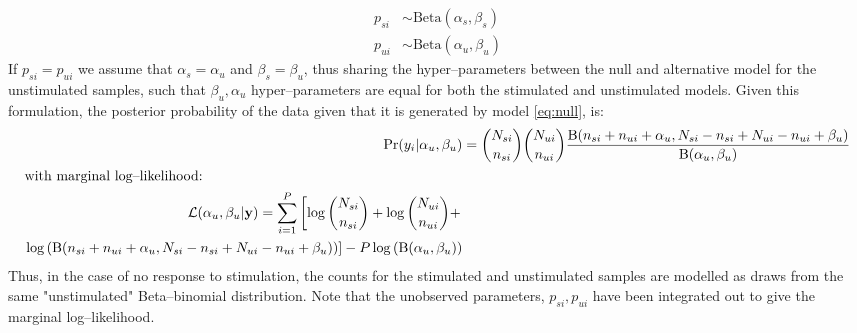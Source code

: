 \documentclass[11pt]{article}
\begin{document}
 \begin{align}
 p_{si} &\sim \mathrm{Beta}(\alpha_s,\beta_s)\label{eq:stimprior}\\
 p_{ui} &\sim \mathrm{Beta}(\alpha_u, \beta_u)\label{eq:nullprior}
 \end{align}
If $p_{si}=p_{ui}$ we assume that $\alpha_s=\alpha_u$ and $\beta_s=\beta_u$, thus sharing the hyper--parameters between the null and alternative model for the unstimulated samples, such that $\beta_u,\alpha_u$ hyper--parameters are equal for both the stimulated and unstimulated models. Given this formulation, the posterior probability of the data given that it is generated by model \eqref{eq:null}, is:
 \begin{align}
  	\mathrm{Pr}(y_i|\alpha_u,\beta_u)
	&=\binom{N_{si}}{n_{si}}\binom{N_{ui}}{n_{ui}}\frac{\mathrm{B}(n_{si}+n_{ui}+\alpha_u,N_{si}-n_{si}+N_{ui}-n_{ui}+\beta_u)}{\mathrm{B}(\alpha_u,\beta_u)}\label{eq:model1post}\\
	\intertext{with marginal log--likelihood:}
	\begin{split}
	\mathcal{L}(\alpha_u,\beta_u|\mathbf{y})=\sum_{i=1}^P\left[\log{\binom{N_{si}}{n_{si}}}+\log{\binom{N_{ui}}{n_{ui}}}+\right.\\
	\left.\log{\left(\mathrm{B}(n_{si}+n_{ui}+\alpha_u,N_{si}-n_{si}+N_{ui}-n_{ui}+\beta_u)\right)}\right]-P\log\left(\mathrm{B}(\alpha_u,\beta_u)\right)\label{eq:model1MLL}
	\end{split}
 \end{align} 
Thus, in the case of no response to stimulation, the counts for the stimulated and unstimulated samples are modelled as draws from the same "unstimulated" Beta--binomial distribution. Note that the unobserved parameters, $p_{si}, p_{ui}$ have been integrated out to give the marginal log--likelihood.
\end{document}

